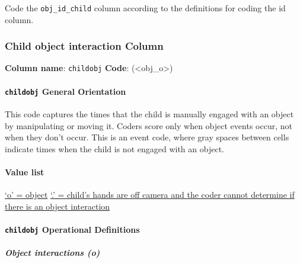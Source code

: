 \documentclass[
  12pt,
]{book}
\begin{document}
Code the \texttt{obj\_id\_child} column according to the definitions for coding the id column.

\hypertarget{child-object-interaction-column}{%
\subsubsection*{Child object interaction Column}\label{child-object-interaction-column}}

\textbf{Column name}: \texttt{childobj}
\textbf{Code}: (\textless obj\_o\textgreater)

\hypertarget{childobj-general-orientation}{%
\paragraph*{\texorpdfstring{\texttt{childobj} General Orientation}{childobj General Orientation}}\label{childobj-general-orientation}}

This code captures the times that the child is manually engaged with an object by manipulating or moving it. Coders score only when object events occur, not when they don't occur. This is an event code, where gray spaces between cells indicate times when the child is not engaged with an object.

\hypertarget{value-list}{%
\paragraph*{Value list}\label{value-list}}

\protect\hyperlink{child_object}{`o' = object}
\protect\hyperlink{child_hands_off_camera}{`.' = child's hands are off camera and the coder cannot determine if there is an object interaction}

\hypertarget{childobj-operational-definitions}{%
\paragraph*{\texorpdfstring{\texttt{childobj} Operational Definitions}{childobj Operational Definitions}}\label{childobj-operational-definitions}}

\hypertarget{child_object}{%
\subparagraph*{Object interactions (o)}\label{child_object}}
\end{document}
